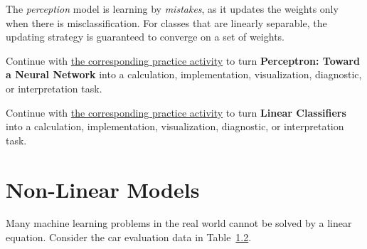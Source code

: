 \documentclass[
  letterpaper,
]{scrbook}
\begin{document}
The \emph{perception} model is learning by \emph{mistakes}, as it
updates the weights only when there is misclassification. For classes
that are linearly separable, the updating strategy is guaranteed to
converge on a set of weights.

\begin{tcolorbox}[enhanced jigsaw, arc=.35mm, bottomrule=.15mm, bottomtitle=1mm, breakable, colback=white, colbacktitle=quarto-callout-tip-color!10!white, colframe=quarto-callout-tip-color-frame, coltitle=black, left=2mm, leftrule=.75mm, opacityback=0, opacitybacktitle=0.6, rightrule=.15mm, title=\textcolor{quarto-callout-tip-color}{\faLightbulb}\hspace{0.5em}{Put it into practice}, titlerule=0mm, toprule=.15mm, toptitle=1mm]

Continue with
\hyperref[sec-pr-07-perceptron-toward-a-neural-network]{the
corresponding practice activity} to turn \textbf{Perceptron: Toward a
Neural Network} into a calculation, implementation, visualization,
diagnostic, or interpretation task.

\end{tcolorbox}

\begin{tcolorbox}[enhanced jigsaw, arc=.35mm, bottomrule=.15mm, bottomtitle=1mm, breakable, colback=white, colbacktitle=quarto-callout-tip-color!10!white, colframe=quarto-callout-tip-color-frame, coltitle=black, left=2mm, leftrule=.75mm, opacityback=0, opacitybacktitle=0.6, rightrule=.15mm, title=\textcolor{quarto-callout-tip-color}{\faLightbulb}\hspace{0.5em}{Put it into practice}, titlerule=0mm, toprule=.15mm, toptitle=1mm]

Continue with \hyperref[sec-pr-07-linear-classifiers]{the corresponding
practice activity} to turn \textbf{Linear Classifiers} into a
calculation, implementation, visualization, diagnostic, or
interpretation task.

\end{tcolorbox}

\section{Non-Linear Models}\label{non-linear-models}

Many machine learning problems in the real world cannot be solved by a
linear equation. Consider the car evaluation data in
Table~\hyperref[tab-bin-car]{1.2}.
\end{document}
